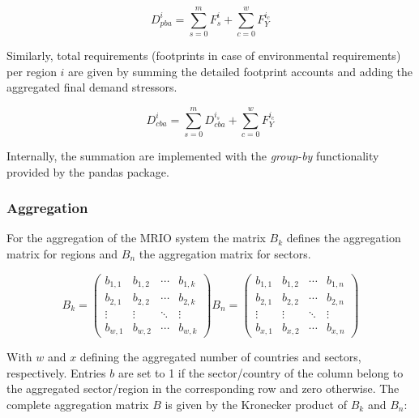 \documentclass{jors}
\begin{document}
{\begin{equation}
    D_{pba}^i = \sum_{s=0}^m F^i_s + \sum_{c=0}^w F_Y^{i_c}
\end{equation}

Similarly, total requirements (footprints in case of environmental requirements) per region $i$ are given by summing the detailed footprint accounts and adding the aggregated final demand stressors.

\begin{equation}
    D_{cba}^i = \sum_{s=0}^m D_{cba}^{i_s} + \sum_{c=0}^w F_Y^{i_c}
\end{equation}

Internally, the summation are implemented with the \textit{group-by} functionality provided by the pandas package.


\subsubsection*{Aggregation}

For the aggregation of the MRIO system the matrix $B_k$ defines
the aggregation matrix for regions and $B_n$ the aggregation matrix
for sectors.

\begin{equation}
    B_k =
    \begin{pmatrix}
      b_{1,1} & b_{1,2} & \cdots & b_{1,k} \\
      b_{2,1} & b_{2,2} & \cdots & b_{2,k} \\
      \vdots  & \vdots  & \ddots & \vdots  \\
      b_{w,1} & b_{w,2} & \cdots & b_{w,k}
    \end{pmatrix}
    B_n =
    \begin{pmatrix}
      b_{1,1} & b_{1,2} & \cdots & b_{1,n} \\
      b_{2,1} & b_{2,2} & \cdots & b_{2,n} \\
      \vdots  & \vdots  & \ddots & \vdots  \\
      b_{x,1} & b_{x,2} & \cdots & b_{x,n}
    \end{pmatrix}
\end{equation}

With $w$ and $x$ defining the aggregated number of countries and sectors,
respectively. Entries $b$ are set to 1 if the sector/country of the column
belong to the aggregated sector/region in the corresponding row and zero
otherwise. The complete aggregation matrix $B$ is given by the Kronecker
product of $B_k$ and $B_n$:

}
\end{document}
